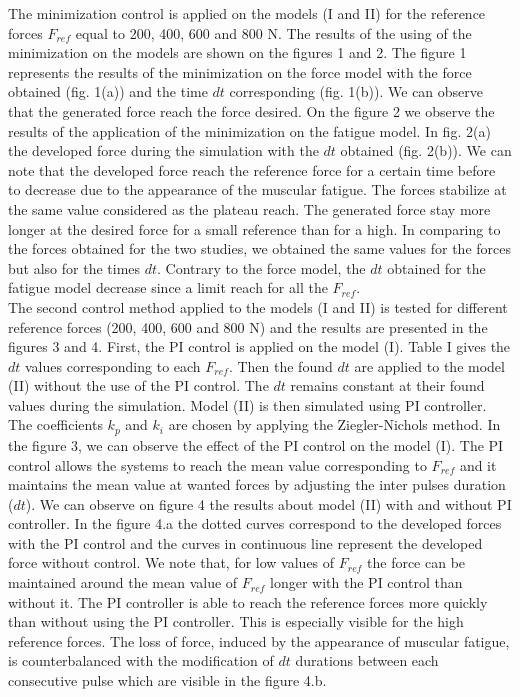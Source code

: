 \documentclass[10pt,twocolumn,letterpaper, 
]{article}
\begin{document}
The minimization control is applied on the models (I and II) for the reference forces $F_{ref}$ equal to 200, 400, 600 and 800 N. The results of the using of the minimization on the models are shown on the figures 1 and 2. The figure 1 represents the results of the minimization on the force model with the force obtained (fig. 1(a)) and the time $dt$ corresponding (fig. 1(b)). We can observe that the generated force reach the force desired. On the figure 2 we observe the results of the application of the minimization on the fatigue model. In fig. 2(a) the developed force during the simulation with the $dt$ obtained (fig. 2(b)). We can note that the developed force reach the reference force for a certain time before to decrease due to the appearance of the muscular fatigue. The forces stabilize at the same value considered as the plateau reach. The generated force stay more longer at the desired force for a small reference than for a high. In comparing to the forces obtained for the two studies, we obtained the same values for the forces but also for the times $dt$. Contrary to the force model, the $dt$ obtained for the fatigue model decrease since a limit reach for all the $F_{ref}$.\\

The second control method applied to the models (I and II) is tested for different reference forces (200, 400, 600 and 800 N) and the results are presented in the figures 3 and 4. First, the PI control is applied on the model (I). Table I gives the $dt$ values corresponding to each $F_{ref}$. Then the found $dt$ are applied to the model (II) without the use of the PI control. The $dt$ remains constant at their found values during the simulation. Model (II) is then simulated using PI controller. The coefficients $k_p$ and $k_i$ are chosen by applying the Ziegler-Nichols method. In the figure 3, we can observe the effect of the PI control on the model (I). The PI control allows the systems to reach the mean value corresponding to $F_{ref}$ and it maintains the mean value at wanted forces by adjusting the inter pulses duration ($dt$). We can observe on figure 4 the results about model (II) with and without PI controller. In the figure 4.a the dotted curves correspond to the developed forces with the PI control and the curves in continuous line represent the developed force without control. We note that, for low values of $F_{ref}$ the force can be maintained around the mean value of $F_{ref}$ longer with the PI control than without it. The PI controller is able to reach the reference forces more quickly than without using the PI controller. This is especially visible for the high reference forces. The loss of force, induced by the appearance of muscular fatigue, is counterbalanced with the modification of $dt$ durations between each consecutive pulse which are visible in the figure 4.b.
\end{document}
